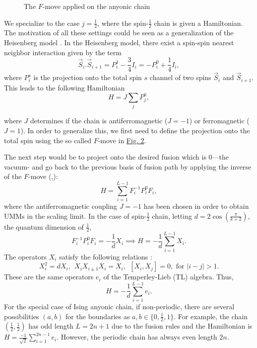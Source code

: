 \documentclass[twoside,11pt,titlepage]{amsart}
\renewcommand{\=}[1]{\stackrel{#1}{=}} %
\theoremstyle{definition}
\theoremstyle{remark}
\begin{document}
\begin{figure}\label{fig2}
\centering
{}
\caption{The $F$-move applied on the anyonic chain}
\end{figure}
We specialize to the case $j=\frac{1}{2}$, where the spin-$\frac{1}{2}$ chain is given a Hamiltonian. The motivation of all these settings could be seen as a generalization of the Heisenberg model \cite{gils2013anyonic}. In the Heisenberg model, there exist a spin-spin nearest neighbor interaction given by the term 
$$\vec{S}_i.\vec{S}_{i+1}=P_i^1-\frac{3}{4}I_i=-P_i^0+\frac{1}{4}I_i,$$
where $P_i^s$ is the projection onto the total spin $s$ channel of two spins $\vec{S}_i$ and $\vec{S}_{i+1}$. This leads to the following Hamiltonian 
$$H=J\sum_j P_j^0,$$

where $J$ determines if the chain is antiferromagnetic ($J=-1$) or ferromagnetic ($J=1$). In order to generalize this, we first need to define the projection onto the total spin using the so called $F$-move in \hyperref[fig2]{Fig. 2}.

The next step would be to project onto the desired fusion which is $0$---the vacuum- and go back to the previous basis of fusion path by applying the inverse of the $F$-move (\cite[Fig. 2]{gils2013anyonic},\cite[Fig. 1(c)]{feiguin2007interacting}):
$$H=\sum_{i=1}^{L-1}F_i^{-1}P_i^0F_i,$$
where the antiferromagnetic coupling $J=-1$ has been chosen in order to obtain UMMs in the scaling limit. In the case of spin-$\frac{1}{2}$ chain, letting $d=2\cos(\frac{\pi}{k+2})$, the quantum dimension of $\frac{1}{2}$, 
$$F_i^{-1}P_i^0F_i=-\frac{1}{d}X_i \implies H=-\frac{1}{d}\sum_{i=1}^{L-1} X_i.$$
The operators $X_i$ satisfy the following relations \cite[eq. (3)]{feiguin2007interacting}:
$$X_i^2=dX_i, \ \ X_iX_{i\pm1}X_i=X_{i}, \ \ [X_i,X_j]=0, \text{ for } |i-j|>1.$$
These are the same operators $e_i$ of the Temperley-Lieb (TL) algebra. Thus,
$$H=-\frac{1}{d}\sum_{i=1}^{L-1} e_i.$$
For the special case of Ising anyonic chain, if non-periodic, there are several possibilities $(a,b)$ for the boundaries as $a,b \in \{0,\frac{1}{2},1\}$. For example, the chain $(\frac{1}{2},\frac{1}{2})$ has odd length $L=2n+1$ due to the fusion rules and the Hamiltonian is $H=\frac{-1}{\sqrt{2}}\sum_{i=1}^{2n-1} e_i$. However, the periodic chain has always even length $2n$.
\end{document}
